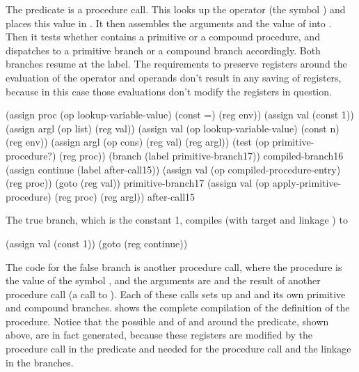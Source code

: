 \noindent
The predicate  is a procedure call.  This looks up the operator
(the symbol \code{=}) and places this value in .  It then assembles
the arguments  and the value of  into .  Then it
tests whether  contains a primitive or a compound procedure, and
dispatches to a primitive branch or a compound branch accordingly.  Both
branches resume at the  label.  The requirements to preserve
registers around the evaluation of the operator and operands don't result in
any saving of registers, because in this case those evaluations don't modify
the registers in question.

\begin{codeBlock}
  (assign proc
          (op lookup-variable-value)
          (const =)
          (reg env))
  (assign val
          (const 1))
  (assign argl
          (op list)
          (reg val))
  (assign val
          (op lookup-variable-value)
          (const n)
          (reg env))
  (assign argl
          (op cons)
          (reg val)
          (reg argl))
  (test (op primitive-procedure?) (reg proc))
  (branch (label primitive-branch17))
compiled-branch16
  (assign continue
          (label after-call15))
  (assign val
          (op compiled-procedure-entry)
          (reg proc))
  (goto (reg val))
primitive-branch17
  (assign val
          (op apply-primitive-procedure)
          (reg proc)
          (reg argl))
after-call15
\end{codeBlock}

\noindent
The true branch, which is the constant 1, compiles (with target  and
linkage ) to

\begin{codeBlock}
(assign val (const 1))
(goto (reg continue))
\end{codeBlock}

\noindent
The code for the false branch is another procedure call, where the procedure
is the value of the symbol \code{*}, and the arguments are  and the
result of another procedure call (a call to ).  Each of these
calls sets up  and  and its own primitive and compound
branches.   shows the complete compilation of the definition
of the  procedure.  Notice that the possible  and
 of  and  around the predicate, shown
above, are in fact generated, because these registers are modified by the
procedure call in the predicate and needed for the procedure call and the
 linkage in the branches.

